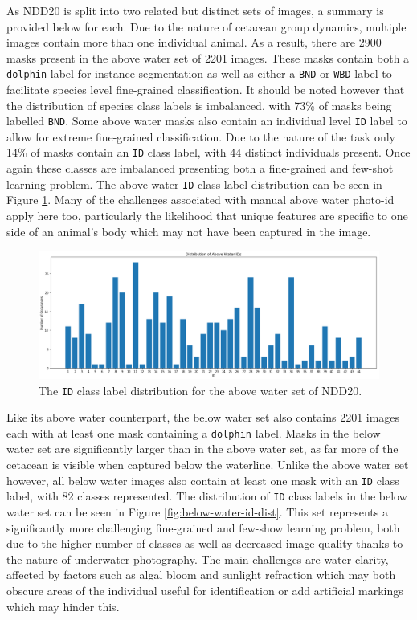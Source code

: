 As NDD20 is split into two related but distinct sets of images, a summary is provided below for each. Due to the nature of cetacean group dynamics, multiple images contain more than one individual animal. As a result, there are 2900 masks present in the above water set of 2201 images. These masks contain both a \texttt{dolphin} label for instance segmentation as well as either a \texttt{BND} or \texttt{WBD} label to facilitate species level fine-grained classification. It should be noted however that the distribution of species class labels is imbalanced, with 73\% of masks being labelled \texttt{BND}. Some above water masks also contain an individual level \texttt{ID} label to allow for extreme fine-grained classification. Due to the nature of the task only 14\% of masks contain an \texttt{ID} class label, with 44 distinct individuals present. Once again these classes are imbalanced presenting both a fine-grained and few-shot learning problem. The above water \texttt{ID} class label distribution can be seen in Figure \ref{fig:above-water-id-dist}. Many of the challenges associated with manual above water photo-id apply here too, particularly the likelihood that unique features are specific to one side of an animal's body which may not have been captured in the image.

\begin{figure}
	\begin{center}
		\includegraphics[scale=0.35]{Chapter4/figs/aboveWaterIDDist.png}
	\end{center}
	\caption{The \texttt{ID} class label distribution for the above water set of NDD20.}
	\label{fig:above-water-id-dist}
\end{figure}

Like its above water counterpart, the below water set also contains 2201 images each with at least one mask containing  a \texttt{dolphin} label. Masks in the below water set are significantly larger than in the above water set, as far more of the cetacean is visible when captured below the waterline. Unlike the above water set however, all below water images also contain at least one mask with an \texttt{ID} class label, with 82 classes represented. The distribution of \texttt{ID} class labels in the below water set can be seen in Figure \ref{fig:below-water-id-dist}. This set represents a significantly more challenging fine-grained and few-show learning problem, both due to the higher number of classes as well as decreased image quality thanks to the nature of underwater photography. The main challenges are water clarity, affected by factors such as algal bloom and sunlight refraction which may both obscure areas of the individual useful for identification or add artificial markings which may hinder this. 

